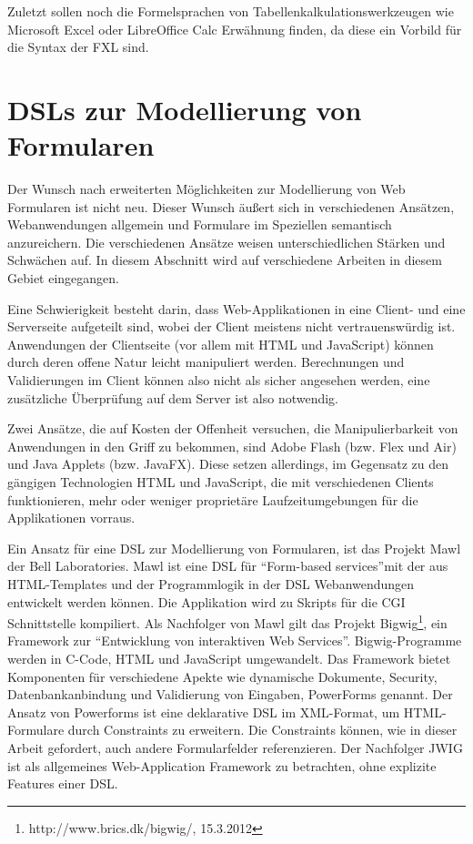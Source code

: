 Zuletzt sollen noch die Formelsprachen von Tabellenkalkulationswerkzeugen wie Microsoft Excel oder LibreOffice Calc Erwähnung finden, da diese ein Vorbild für die Syntax der FXL sind.


\section{DSLs zur Modellierung von Formularen}

Der Wunsch nach erweiterten Möglichkeiten zur Modellierung von Web Formularen ist nicht neu. Dieser Wunsch äußert sich in verschiedenen Ansätzen, Webanwendungen allgemein und Formulare im Speziellen semantisch anzureichern. Die verschiedenen Ansätze weisen unterschiedlichen Stärken und Schwächen auf. In diesem Abschnitt wird auf verschiedene Arbeiten in diesem Gebiet eingegangen.

Eine Schwierigkeit besteht darin, dass Web-Applikationen in eine Client- und eine Serverseite aufgeteilt sind, wobei der Client meistens nicht vertrauenswürdig ist. Anwendungen der Clientseite (vor allem mit HTML und JavaScript) können durch deren offene Natur leicht manipuliert werden. Berechnungen und Validierungen im Client können also nicht als sicher angesehen werden, eine zusätzliche Überprüfung auf dem Server ist also notwendig. 

Zwei Ansätze, die auf Kosten der Offenheit versuchen, die Manipulierbarkeit von Anwendungen in den Griff zu bekommen, sind Adobe Flash (bzw. Flex und Air) und Java Applets (bzw. JavaFX). Diese setzen allerdings, im Gegensatz zu den gängigen Technologien HTML und JavaScript, die mit verschiedenen Clients funktionieren, mehr oder weniger proprietäre Laufzeitumgebungen für die Applikationen vorraus.

Ein Ansatz für eine DSL zur Modellierung von Formularen, ist das Projekt Mawl der Bell Laboratories\cite{AtBa99}. Mawl ist eine DSL für ``Form-based services''mit der aus HTML-Templates und der Programmlogik in der DSL Webanwendungen entwickelt werden können. Die Applikation wird zu Skripts für die CGI Schnittstelle kompiliert. Als Nachfolger von Mawl gilt das Projekt Bigwig\footnote{http://www.brics.dk/bigwig/, 15.3.2012}, ein Framework zur ``Entwicklung von interaktiven Web Services''. Bigwig-Programme werden in C-Code, HTML und JavaScript umgewandelt. Das Framework bietet Komponenten für verschiedene Apekte wie dynamische Dokumente, Security, Datenbankanbindung und Validierung von Eingaben, PowerForms genannt. Der Ansatz von Powerforms\cite{BrMo00} ist eine deklarative DSL im XML-Format, um HTML-Formulare durch Constraints zu erweitern. Die Constraints können, wie in dieser Arbeit gefordert, auch andere Formularfelder referenzieren. Der Nachfolger JWIG ist als allgemeines Web-Application Framework zu betrachten, ohne explizite Features einer DSL.

